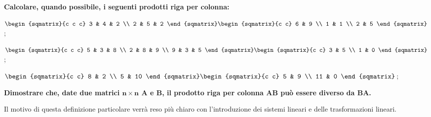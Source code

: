 \begin{exer}
    \textbf{Calcolare, quando possibile, i seguenti prodotti riga per colonna:}

    $
        \begin{sqmatrix}{c c c}
            3 & 4 & 2 \\
            2 & 5 & 2
        \end{sqmatrix}
        \begin{sqmatrix}{c c}
            6 & 9 \\
            1 & 1 \\
            2 & 5
        \end{sqmatrix}
    $;

    $
        \begin{sqmatrix}{c c c}
            5 & 3 & 8 \\
            2 & 8 & 9 \\
            9 & 3 & 5
        \end{sqmatrix}
        \begin{sqmatrix}{c c}
            3 & 5 \\
            1 & 0
        \end{sqmatrix}
    $;

    $
        \begin{sqmatrix}{c c}
            8 & 2 \\
            5 & 10
        \end{sqmatrix}
        \begin{sqmatrix}{c c}
            5 & 9 \\
            11 & 0
        \end{sqmatrix}
    $;
\end{exer}
\begin{exer}
    \textbf{Dimostrare che, date due matrici $\bm{n \times n}$ $\bm{A}$ e $\bm{B}$, il prodotto riga per colonna $\bm{AB}$ può essere diverso da $\bm{BA}$.}
\end{exer}
Il motivo di questa definizione particolare verrà reso più chiaro con l'introduzione dei sistemi lineari e delle trasformazioni lineari.

